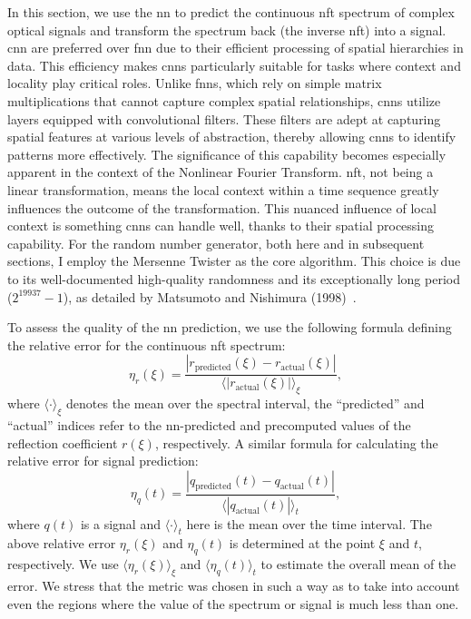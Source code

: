 In this section, we use the \acrshort{nn} to predict the continuous \acrshort{nft} spectrum of complex optical signals and transform the spectrum back (the inverse \acrshort{nft}) into a signal. 
\acrfull{cnn} are preferred over \acrfull{fnn} due to their efficient processing of spatial hierarchies in data. This efficiency makes \acrshort{cnn}s particularly suitable for tasks where context and locality play critical roles. Unlike \acrshort{fnn}s, which rely on simple matrix multiplications that cannot capture complex spatial relationships, \acrshort{cnn}s utilize layers equipped with convolutional filters. These filters are adept at capturing spatial features at various levels of abstraction, thereby allowing \acrshort{cnn}s to identify patterns more effectively. The significance of this capability becomes especially apparent in the context of the Nonlinear Fourier Transform. \acrshort{nft}, not being a linear transformation, means the local context within a time sequence greatly influences the outcome of the transformation. This nuanced influence of local context is something \acrshort{cnn}s can handle well, thanks to their spatial processing capability. For the random number generator, both here and in subsequent sections, I employ the Mersenne Twister as the core algorithm. This choice is due 
to its well-documented high-quality randomness and its exceptionally 
long period ($2^{19937}-1$), as detailed by Matsumoto and Nishimura (1998)~\cite{matsumoto1998mersenne}.

To assess the quality of the \acrshort{nn} prediction, we use the following formula defining the relative error for the continuous \acrshort{nft} spectrum:
\begin{equation}
    \eta_r(\xi) = \frac{|r_\text{predicted}(\xi) - r_\text{actual}(\xi)| }{\langle |r_\text{actual}(\xi)| \rangle_{\xi}} {,}
\end{equation}
where $\langle \cdot \rangle_{\xi}$ denotes the mean over the spectral interval, the ``predicted'' and ``actual'' indices refer to the \acrshort{nn}-predicted and precomputed values of the reflection coefficient $r(\xi)$, respectively. A similar formula for calculating the relative error for signal prediction:
\begin{equation}
    \eta_q(t) = \frac{|q_\text{predicted}(t) - q_\text{actual}(t)| }{\langle |q_\text{actual}(t)| \rangle_{t}} {,}
\end{equation}
where $q(t)$ is a signal and $\langle \cdot \rangle_{t}$ here is the mean over the time interval. The above relative error $\eta_r(\xi)$ and $\eta_q(t)$ is determined at the point $\xi$ and $t$, respectively. We use $\langle \eta_r(\xi) \rangle_{\xi}$ and $\langle \eta_q(t) \rangle_{t}$ to estimate the overall mean of the error. We stress that the metric was chosen in such a way as to take into account even the regions where the value of the spectrum or signal is much less than one.

